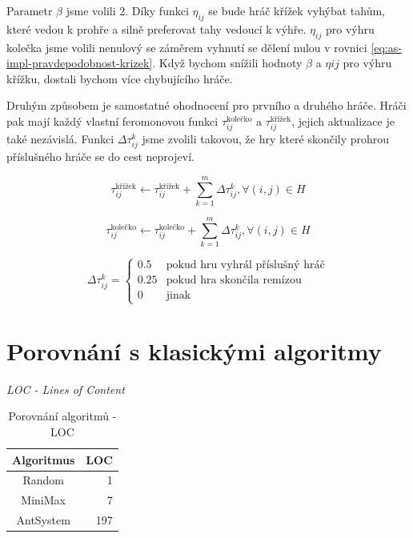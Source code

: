 \documentclass[12pt]{article}
\begin{document}
Parametr $\beta$ jsme volili 2. Díky funkci $\eta_{ij}$ se bude hráč křížek vyhýbat tahům, které vedou k prohře a silně preferovat tahy vedoucí k výhře. $\eta_{ij}$ pro výhru kolečka jsme volili nenulový se záměrem vyhnutí se dělení nulou v rovnici \eqref{eq:as-impl-pravdepodobnost-krizek}. Když bychom snížili hodnoty $\beta$ a $\eta{ij}$ pro výhru křížku, dostali bychom více chybujícího hráče. 

Druhým způsobem je samostatné ohodnocení pro prvního a druhého hráče. Hráči pak mají každý vlastní feromonovou funkci $\tau_{ij}^\text{kolečko}$ a $\tau_{ij}^\text{křížek}$, jejich aktualizace je také nezávislá. Funkci $\Delta \tau_{ij}^k$ jsme zvolili takovou, že hry které skončily prohrou příslušného hráče se do cest neprojeví. 

\begin{equation}
  \tau_{ij}^\text{křížek} \leftarrow \tau_{ij}^\text{křížek} + \sum_{k=1}^m \Delta \tau_{ij}^ {k},    \forall(i,j) \in H
\end{equation}

\begin{equation}
  \tau_{ij}^\text{kolečko} \leftarrow \tau_{ij}^\text{kolečko} + \sum_{k=1}^m \Delta \tau_{ij}^ {k},    \forall(i,j) \in H
\end{equation}

\begin{equation}
  \Delta \tau_{ij}^{k} = \begin{cases} 
    0.5 &\text{pokud hru vyhrál příslušný hráč}
    \\
    0.25 &\text{pokud hra skončila remízou}
    \\
    0 &\text{jinak}
  \end{cases}
\end{equation}

\section{Porovnání s klasickými algoritmy}

\begin{table}[tbh]
 \caption{Porovnání algoritmů - LOC}
\begin{small}
  \textit{LOC - Lines of Content}
\end{small}
 \begin{center}
   \begin{tabular}{|c|r|}
      \hline 
      Algoritmus & LOC \\ \hline  \hline
      Random & 1 \\ \hline 
      MiniMax & 7 \\ \hline 
      AntSystem & 197 \\ \hline 
    \end{tabular}
  \end{center}
  \label{tab:loc}
\end{table}
\end{document}
